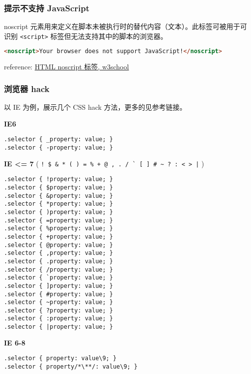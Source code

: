 \subsubsection{提示不支持
JavaScript}\label{ux63d0ux793aux4e0dux652fux6301-javascript}

noscript
元素用来定义在脚本未被执行时的替代内容（文本）。此标签可被用于可识别
\lstinline!<script>! 标签但无法支持其中的脚本的浏览器。

\begin{lstlisting}[language=HTML]
<noscript>Your browser does not support JavaScript!</noscript>
\end{lstlisting}

reference: \href{http://www.w3school.com.cn/tags/tag_noscript.asp}{HTML
noscript 标签, w3school}

\subsubsection{浏览器 hack}\label{ux6d4fux89c8ux5668-hack}

以 IE 为例，展示几个 CSS hack 方法，更多的见参考链接。

\textbf{IE6}

\begin{lstlisting}
.selector { _property: value; }
.selector { -property: value; }
\end{lstlisting}

\textbf{IE \textless{}= 7} (
\lstinline"! $ & * ( ) = % + @ , . / ` [ ] # ~ ? : < > |" )

\begin{lstlisting}
.selector { !property: value; }
.selector { $property: value; }
.selector { &property: value; }
.selector { *property: value; }
.selector { )property: value; }
.selector { =property: value; }
.selector { %property: value; }
.selector { +property: value; }
.selector { @property: value; }
.selector { ,property: value; }
.selector { .property: value; }
.selector { /property: value; }
.selector { `property: value; }
.selector { ]property: value; }
.selector { #property: value; }
.selector { ~property: value; }
.selector { ?property: value; }
.selector { :property: value; }
.selector { |property: value; }
\end{lstlisting}

\textbf{IE 6-8}

\begin{lstlisting}
.selector { property: value\9; }
.selector { property/*\**/: value\9; }
\end{lstlisting}

